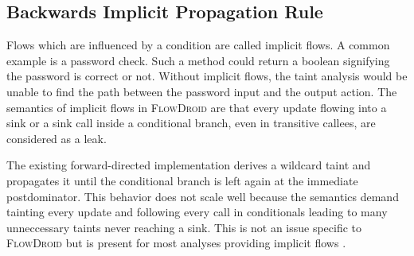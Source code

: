 \documentclass[../draft.tex]{subfiles}
\begin{document}
    \subsection{Backwards Implicit Propagation Rule}
    Flows which are influenced by a condition are called implicit flows. 
    A common example is a password check. 
    Such a method could return a boolean signifying the password is correct or not. 
    Without implicit flows, the taint analysis would be unable to find the path between the password input and the output action. 
    The semantics of implicit flows in \textsc{FlowDroid} are that every update flowing into a sink or a sink call inside a conditional branch, even in transitive callees, are considered as a leak.
    
    The existing forward-directed implementation derives a wildcard taint\footnotemark{} and propagates it until the conditional branch is left again at the immediate postdominator. 
    This behavior does not scale well because the semantics demand tainting every update and following every call in conditionals leading to many unneccessary taints never reaching a sink.
    This is not an issue specific to \textsc{FlowDroid} but is present for most analyses providing implicit flows \cite{King2008}.
\end{document}
